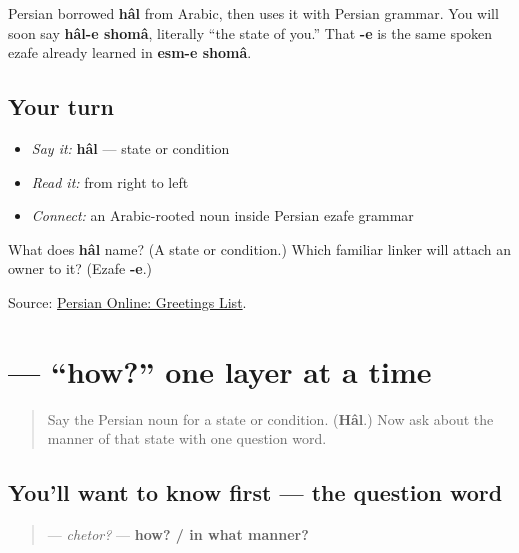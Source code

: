 \begin{cousinweb}
Persian borrowed \textbf{hâl} from Arabic, then uses it with Persian grammar. You will soon say \textbf{hâl-e shomâ}, literally “the state of you.” That \textbf{-e} is the same spoken ezafe already learned in \textbf{esm-e shomâ}.
\end{cousinweb}

\subsection*{Your turn}
\begin{itemize}
\raggedright
  \item \emph{Say it:} \textbf{hâl} — state or condition
  \item \emph{Read it:} \textbf{} from right to left
  \item \emph{Connect:} an Arabic-rooted noun inside Persian ezafe grammar
\end{itemize}

\begin{tcolorbox}[breakable,colback=teal!4,colframe=teal!35!black,title={Before you move on}]
What does \textbf{hâl} name? (A state or condition.) Which familiar linker will attach an owner to it? (Ezafe \textbf{-e}.)

Source: \href{https://sites.la.utexas.edu/persian\_online\_resources/vocabulary-lists/meetings-introductions/}{Persian Online: Greetings List}.
\end{tcolorbox}
\section[\texorpdfstring{\fa{چطور} (chetor)}{چطور (chetor)}]{ — “how?” one layer at a time}

\label{lesson:FA-C04-chetor}



\begin{quote}
Say the Persian noun for a state or condition. (\textbf{Hâl}.) Now ask about the manner of that state with one question word.
\end{quote}

\subsection*{You'll want to know first — the question word}
\begin{quote}
\textbf{} — \emph{chetor?} — \textbf{how? / in what manner?}
\end{quote}

